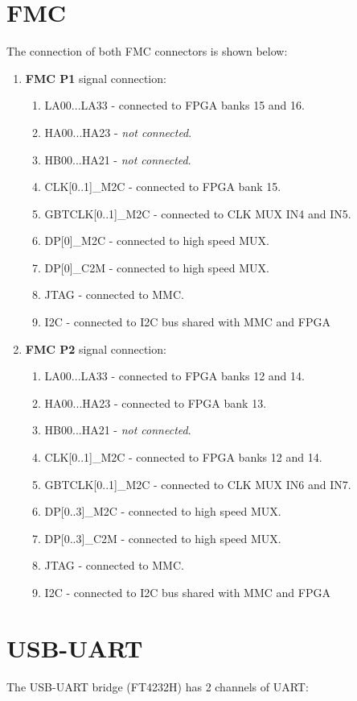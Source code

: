 \documentclass[12pt,oneside,a4]{article}
\begin{document}
\section{FMC}
The connection of both FMC connectors is shown below:
\begin{enumerate}
    \item \textbf{FMC P1} signal connection:
    \begin{enumerate}
        \item LA00...LA33 - connected to FPGA banks 15 and 16.
        \item HA00...HA23 - \textit{not connected}.
        \item HB00...HA21 - \textit{not connected}.
        \item CLK[0..1]\_M2C - connected to FPGA bank 15.
        \item GBTCLK[0..1]\_M2C - connected to CLK MUX IN4 and IN5.
        \item DP[0]\_M2C - connected to high speed MUX.
        \item DP[0]\_C2M - connected to high speed MUX.
        \item JTAG - connected to MMC.
        \item I2C - connected to I2C bus shared with MMC and FPGA
    \end{enumerate}
    \item \textbf{FMC P2} signal connection:
    \begin{enumerate}
        \item LA00...LA33 - connected to FPGA banks 12 and 14.
        \item HA00...HA23 - connected to FPGA bank 13.
        \item HB00...HA21 - \textit{not connected}.
        \item CLK[0..1]\_M2C - connected to FPGA banks 12 and 14.
        \item GBTCLK[0..1]\_M2C - connected to CLK MUX IN6 and IN7.
        \item DP[0..3]\_M2C - connected to high speed MUX.
        \item DP[0..3]\_C2M - connected to high speed MUX.
        \item JTAG - connected to MMC.
        \item I2C - connected to I2C bus shared with MMC and FPGA
    \end{enumerate}
\end{enumerate}

\section{USB-UART}
The USB-UART bridge (FT4232H) has 2 channels of UART:
\end{document}
